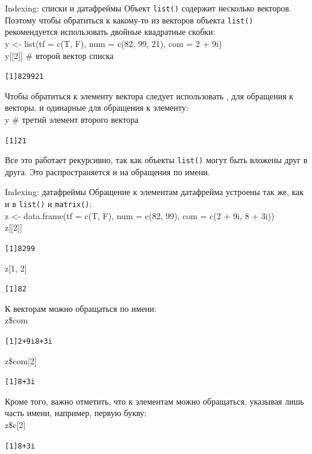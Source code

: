 \begin{frame}[fragile]{Indexing: списки и датафреймы}
Объект \footnotesize\verb"list()"\normalsize{} содержит несколько векторов. Поэтому чтобы обратиться к какому-то из векторов объекта \footnotesize\verb"list()"\normalsize{} рекомендуется использовать двойные  квадратные скобки: \medskip\\
y <- list(tf = c(T, F), num = c(82, 99, 21), com = 2 + 9i)\\
y[[2]] \hfill \# второй вектор списка
\footnotesize
\begin{alltt}
[1] 82 99 21
\end{alltt}
\normalsize
Чтобы обратиться к элементу вектора следует использовать {\color{red!13!blue}{только двойные скобки}}, для обращения к векторы, и одинарные для обращения к элементу:\medskip\\
y{\color{red!13!blue}{[[2]][3]}} \hfill \# третий элемент второго вектора
\footnotesize
\begin{alltt}
[1] 21
\end{alltt}
\normalsize
Все это работает рекурсивно, так как объекты \footnotesize\verb"list()"\normalsize{}  могут быть вложены друг в друга. Это распространяется и на обращения по имени.
\end{frame}
\begin{frame}[fragile]{Indexing: датафреймы}
Обращение к элементам датафрейма устроены так же, как и в \footnotesize\verb"list()"\normalsize{} и \footnotesize\verb"matrix()"\normalsize{}:\\
z <- data.frame(tf = c(T, F), num = c(82, 99), com = c(2 + 9i, 8 + 3i))\\
z[[2]]
\footnotesize
\begin{alltt}
[1] 82 99
\end{alltt}
\normalsize
z[1, 2]
\footnotesize
\begin{alltt}
[1] 82
\end{alltt}
\normalsize
К векторам можно обращаться по имени: \\
z\$com
\footnotesize
\begin{alltt}
[1] 2+9i 8+3i
\end{alltt}
\normalsize
z\$com[2]
\footnotesize
\begin{alltt}
[1] 8+3i
\end{alltt}
\normalsize
Кроме того, важно отметить, что к элементам можно обращаться, указывая лишь часть имени, например, первую букву:\\
z\$c[2]
\footnotesize
\begin{alltt}
[1] 8+3i
\end{alltt}
\normalsize
\end{frame}
